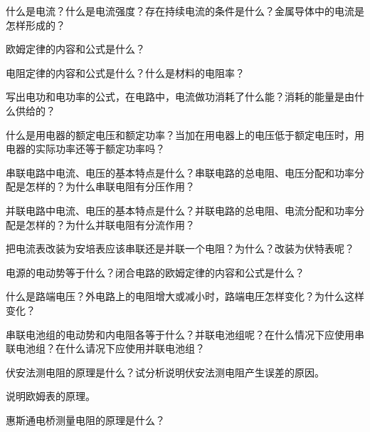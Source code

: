\begin{Review}
\begin{question}
  \item 什么是电流？什么是电流强度？存在持续电流的条件是什么？金属导体中的电流是怎样形成的？
  \item 欧姆定律的内容和公式是什么？
  \item 电阻定律的内容和公式是什么？什么是材料的电阻率？
  \item 写出电功和电功率的公式，在电路中，电流做功消耗了什么能？消耗的能量是由什么供给的？
  \item 什么是用电器的额定电压和额定功率？当加在用电器上的电压低于额定电压时，用电器的实际功率还等于额定功率吗？
  \item 串联电路中电流、电压的基本特点是什么？串联电路的总电阻、电压分配和功率分配是怎样的？为什么串联电阻有分压作用？
  \item 并联电路中电流、电压的基本特点是什么？并联电路的总电阻、电流分配和功率分配是怎样的？为什么并联电阻有分流作用？
  \item 把电流表改装为安培表应该串联还是并联一个电阻？为什么？改装为伏特表呢？
  \item 电源的电动势等于什么？闭合电路的欧姆定律的内容和公式是什么？
  \item 什么是路端电压？外电路上的电阻增大或减小时，路端电圧怎样变化？为什么这样变化？
  \item 串联电池组的电动势和内电阻各等于什么？并联电池组呢？在什么情况下应使用串联电池组？在什么请况下应使用并联电池组？
  \item 伏安法测电阻的原理是什么？试分析说明伏安法测电阻产生误差的原因。
  \item 说明欧姆表的原理。
  \item 惠斯通电桥测量电阻的原理是什么？
\end{question}
\end{Review}

